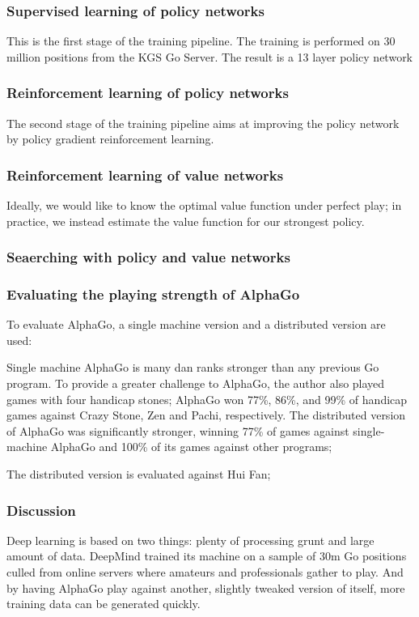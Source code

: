 \subsubsection{Supervised learning of policy networks}
This is the first stage of the training pipeline. The training is performed on 30 million positions from the KGS Go Server. The result is a 13 layer policy network
\subsubsection{Reinforcement learning of policy networks}
The second stage of the training pipeline aims at improving the policy network by policy gradient reinforcement learning.
\subsubsection{Reinforcement learning of value networks}
Ideally, we would like to know the optimal value function under perfect play; in practice, we instead estimate the value function for our strongest policy.
\subsubsection{Seaerching with policy and value networks}

\subsubsection{Evaluating the playing strength of AlphaGo}
To evaluate AlphaGo, a single machine version and a distributed version are used:
\begin{inparaenum}
	\item Single machine AlphaGo is many dan ranks stronger than any previous Go program. To provide a greater challenge to AlphaGo, the author also played games with four handicap stones; AlphaGo won 77\%, 86\%, and 99\% of handicap games against Crazy Stone, Zen and Pachi, respectively. The distributed version of AlphaGo was significantly stronger, winning 77\% of games against single-machine AlphaGo and 100\% of its games against other programs;
	\item The distributed version is evaluated against Hui Fan;
\end{inparaenum}
\subsubsection{Discussion}
Deep learning is based on two things: plenty of processing grunt and large amount of data. DeepMind trained its machine on a sample of 30m Go positions culled from online servers where amateurs and professionals gather to play. And by having AlphaGo play against another, slightly tweaked version of itself, more training data can be generated quickly.

